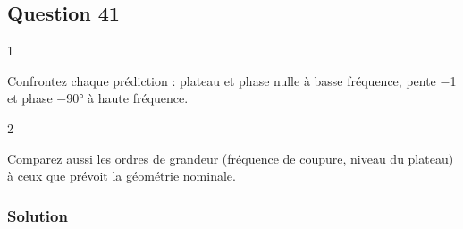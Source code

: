 \documentclass[11pt,a4paper]{article}
\begin{document}
\hypertarget{question-41}{%
\subsection{Question 41}\label{question-41}}

\begin{indication}{1}

Confrontez chaque prédiction : plateau et phase nulle à basse fréquence, pente −1 et phase −90° à haute fréquence.

\end{indication}

\begin{indication}{2}

Comparez aussi les ordres de grandeur (fréquence de coupure, niveau du plateau) à ceux que prévoit la géométrie nominale.

\end{indication}

\hypertarget{solution-40}{%
\subsubsection{Solution}\label{solution-40}}
\end{document}
